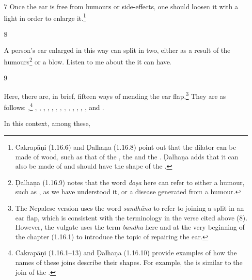 \begin{translation}
    \item[7]
    Once the ear is free from humours or side-effects, one should 
    loosen it with a light  in order to enlarge it.\footnote{Cakrapāṇi (1.16.6) and Ḍalhaṇa (1.16.8) point out that the dilator can be made of wood, such as that of the , the  and the . Ḍalhaṇa adds that it can also be made of  and should have the shape of the .}
    
    \item[8]
    
    \begin{sloka}

A person's ear enlarged in this way can split in two, either as a result of the humours\footnote{Ḍalhaṇa (1.16.9) notes that the word \emph{doṣa} here can refer to either a humour, such as , as we have understood it, or a disease generated from a humour.} or a blow. Listen to me about the  it can have.
        
    \end{sloka}
    
        \item[9]
    
Here, there are, in brief, fifteen ways of mending the ear flap.\footnote{The Nepalese version uses the word \emph{sandhāna} to refer to joining a split in an ear flap, which is consistent with the terminology in the verse cited above (8). However, the vulgate uses the term \emph{bandha} here and at the very beginning of the chapter (1.16.1) to introduce the topic of repairing the ear.}  They are as follows:
    ,\footnote{Cakrapāṇi (1.16.1–13) and Ḍalhaṇa (1.16.10) provide examples of how the names of these joins describe their shapes. For example, the  is similar to the join of the .} , , , , , , , , , 
    , ,
    , , and .
    
    In this context, among these, 
    \begin{description}
        

\end{description}
\end{translation}

